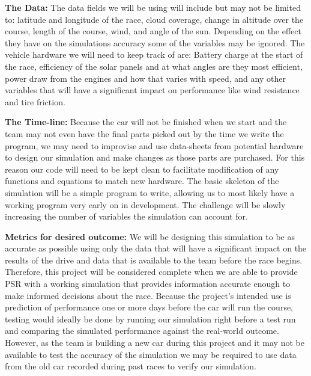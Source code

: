 \documentclass[10pt]{IEEEtran}
\begin{document}
\textbf{The Data:}
The data fields we will be using will include but may not be limited to: latitude and longitude of the race, cloud coverage, change in altitude over the course, length of the course, wind, and angle of the sun. Depending on the effect they have on the simulations accuracy some of the variables may be ignored. The vehicle hardware we will need to keep track of are: Battery charge at the start of the race, efficiency of the solar panels and at what angles are they most efficient, power draw from the engines and how that varies with speed, and any other variables that will have a significant impact on performance like wind resistance and tire friction.

\textbf{The Time-line:}
Because the car will not be finished when we start and the team may not even have the final parts picked out by the time we write the program, we may need to improvise and use data-sheets from potential hardware to design our simulation and make changes as those parts are purchased. For this reason our code will need to be kept clean to facilitate modification of any functions and equations to match new hardware. The basic skeleton of the simulation will be a simple program to write, allowing us to most likely have a working program very early on in development. The challenge will be slowly increasing the number of variables the simulation can account for. 

\textbf{Metrics for desired outcome:}
We will be designing this simulation to be as accurate as possible using only the data that will have a significant impact on the results of the drive and data that is available to the team before the race begins. Therefore, this project will be considered complete when we are able to provide PSR with a working simulation that provides information accurate enough to make informed decisions about the race. Because the project’s intended use is prediction of performance one or more days before the car will run the course, testing would ideally be done by running our simulation right before a test run and comparing the simulated performance against the real-world outcome. However, as the team is building a new car during this project and it may not be available to test the accuracy of the simulation we may be required to use data from the old car recorded during past races to verify our simulation.
\end{document}
